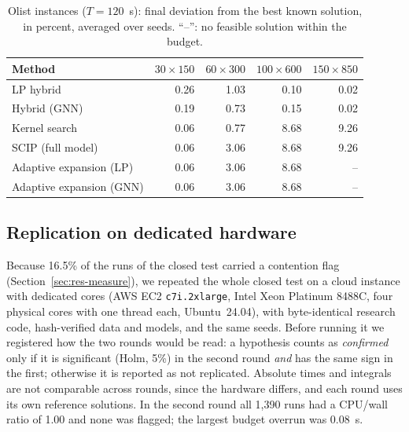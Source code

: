 \begin{table}[t]\centering\small
\caption{Olist instances ($T=120$~s): final deviation from the best known solution, in percent,
averaged over seeds. ``--'': no feasible solution within the budget.}\label{tab:olist}
\begin{tabular}{lrrrr}
\toprule
Method & $30\times150$ & $60\times300$ & $100\times600$ & $150\times850$ \\
\midrule
LP hybrid & 0.26 & 1.03 & 0.10 & 0.02 \\
Hybrid (GNN) & 0.19 & 0.73 & 0.15 & 0.02 \\
Kernel search & 0.06 & 0.77 & 8.68 & 9.26 \\
SCIP (full model) & 0.06 & 3.06 & 8.68 & 9.26 \\
Adaptive expansion (LP) & 0.06 & 3.06 & 8.68 & -- \\
Adaptive expansion (GNN) & 0.06 & 3.06 & 8.68 & -- \\
\bottomrule
\end{tabular}
\end{table}

\subsection{Replication on dedicated hardware}\label{sec:res-repl}
Because 16.5\% of the runs of the closed test carried a contention flag
(Section~\ref{sec:res-measure}), we repeated the whole closed test on a cloud instance with
dedicated cores (AWS EC2 \texttt{c7i.2xlarge}, Intel Xeon Platinum 8488C, four physical cores
with one thread each, Ubuntu~24.04), with byte-identical research code, hash-verified data and
models, and the same seeds. Before running it we registered how the two rounds would be read: a
hypothesis counts as \emph{confirmed} only if it is significant (Holm, 5\%) in the second round
\emph{and} has the same sign in the first; otherwise it is reported as not replicated. Absolute
times and integrals are not comparable across rounds, since the hardware differs, and each round
uses its own reference solutions. In the second round all 1{,}390 runs had a CPU/wall ratio of
1.00 and none was flagged; the largest budget overrun was 0.08~s.

